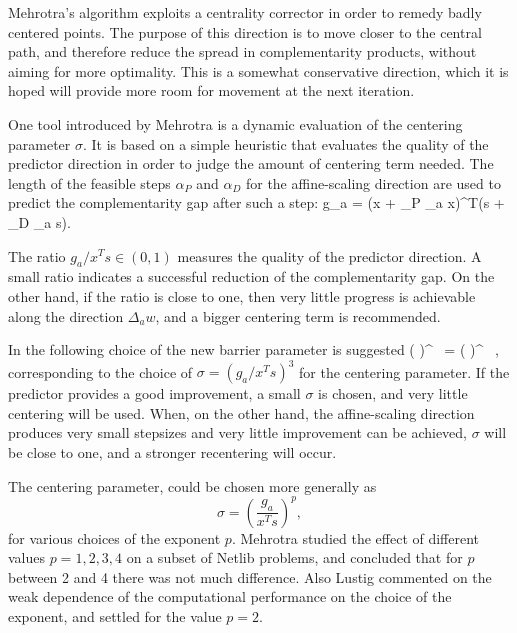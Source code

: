 Mehrotra's algorithm exploits a centrality corrector in order to 
remedy badly centered points. The purpose of this direction is 
to move closer to the central path, and therefore reduce the spread 
in complementarity products, without aiming for more optimality. 
This is a somewhat conservative direction, which it is hoped will 
provide more room for movement at the next iteration.

One tool introduced by Mehrotra \cite{Mehrotra92} is a dynamic evaluation 
of the centering parameter $\sigma$. It is based on a simple  
heuristic that evaluates the quality of the predictor direction
in order to judge the amount of centering term needed.
%
The length of the feasible steps $\alpha_P$ and $\alpha_D$
for the affine-scaling direction are used to 
predict the complementarity gap after such a step:
\be \label{eq:PredictedGap}
  g_a = (x + \alpha_P \Delta_a x)^T(s + \alpha_D \Delta_a s).
\ee

The ratio $g_a / x^{T}s \in (0,1)$ measures the quality of the 
predictor direction.
A small ratio indicates a successful reduction of the complementarity 
gap. On the other hand, if the ratio is close to one, then very little 
progress is achievable along the direction $\Delta_a w$,
and a bigger centering term
is recommended.

In \cite{Mehrotra92} the following choice of the new barrier parameter 
is suggested
%
\be \label{eq:Mu}
  \left(  \right)^{} \, 
           = \left(  \right)^{} \, ,
\ee
%
corresponding to the choice of $\sigma = (g_a / x^Ts)^3$ 
for the centering parameter. 
If the predictor provides a good improvement, a small $\sigma$ 
is chosen, and very little centering will be used. When, 
on the other hand, the affine-scaling direction produces very small stepsizes 
and very little improvement can be achieved, $\sigma$ will be 
close to one, and a stronger recentering will occur.

The centering parameter, could be chosen more generally as
\[
  \sigma = \left( \frac{g_a}{x^Ts} \right)^p\!\!,
\]
for various choices of the exponent $p$. Mehrotra \cite{Mehrotra92}
studied the effect of different values $p=1,2,3,4$
on a subset of Netlib problems, and concluded that for $p$ between
2 and 4 there was not much difference.
Also Lustig \etal \cite{LustigMarstenShanno} commented on the
weak dependence of the computational performance on the choice 
of the exponent, and settled for the value $p=2$.

